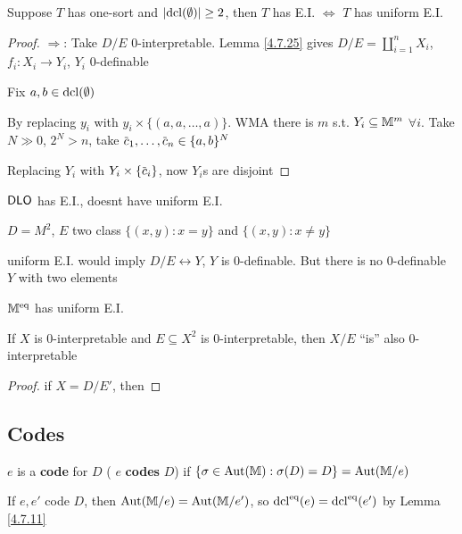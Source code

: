 \documentclass[11pt]{article}
\begin{document}
\begin{theorem}[]
Suppose \(T\) has one-sort and \(\abs{\dcl(\emptyset)}\ge 2\), then \(T\) has E.I. \(\Leftrightarrow\) \(T\) has uniform E.I.
\end{theorem}

\begin{proof}
\(\Rightarrow\): Take \(D/E\) 0-interpretable. Lemma \ref{4.7.25}
gives \(D/E=\coprod_{i=1}^nX_i\), \(f_i:X_i\to Y_i\), \(Y_i\) 0-definable

Fix \(a,b\in\operatorname{dcl}(\emptyset)\)

By replacing \(y_i\) with \(y_i\times\{(a,a,\dots,a)\}\). WMA there is \(m\) s.t. \(Y_i\subseteq\mathbb{M}^m\) \(\forall i\).
Take \(N\gg 0\), \(2^N>n\), take \(\barc_1,\dots,\barc_n\in\{a,b\}^N\)

Replacing \(Y_i\) with \(Y_i\times\{\barc_i\}\), now \(Y_i\)s are disjoint
\end{proof}

\begin{examplle}[]
\(\operatorname{\textsf{DLO}}\) has E.I., doesnt have uniform E.I.

\(D=M^2\), \(E\) two class \(\{(x,y):x=y\}\) and \(\{(x,y):x\neq y\}\)

uniform E.I. would imply \(D/E\leftrightarrow Y\), \(Y\) is 0-definable. But there is no 0-definable \(Y\)
with two elements
\end{examplle}

\begin{remark}
\(\mathbb{M}^{\operatorname{eq}}\) has uniform E.I.

If \(X\) is 0-interpretable and \(E\subseteq X^2\) is 0-interpretable, then \(X/E\) ``is'' also 0-interpretable
\end{remark}

\begin{proof}
if \(X=D/E'\), then 
\end{proof}

\subsection{Codes}
\label{sec:org1a8bc8f}
\begin{definition}[]
\(e\) is a \textbf{code} for \(D\) ( \(e\) \textbf{codes} \(D\)) if \(\{\sigma\in\operatorname{\text{Aut}}(\mathbb{M}):\sigma(D)=D\}=\operatorname{\text{Aut}}(\mathbb{M}/e)\)
\end{definition}

\begin{remark}
If \(e,e'\) code \(D\), then \(\operatorname{\text{Aut}}(\mathbb{M}/e)=\operatorname{\text{Aut}}(\mathbb{M}/e')\), so \(\operatorname{dcl}^{\operatorname{eq}}(e)=\operatorname{dcl}^{\operatorname{eq}}(e')\) by
Lemma \ref{4.7.11}
\end{remark}
\end{document}
